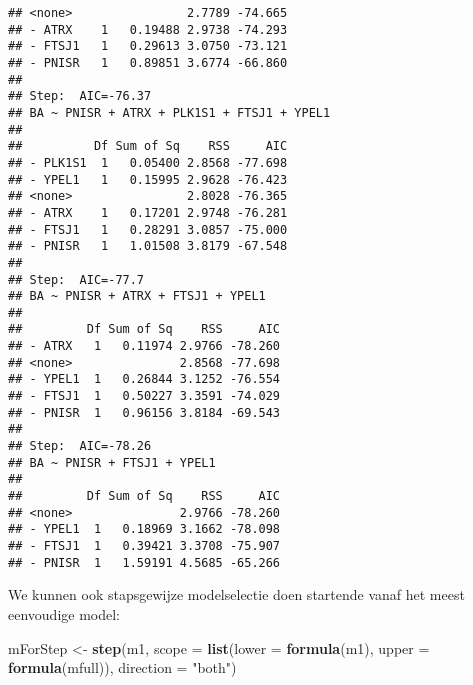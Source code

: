 \documentclass[12pt,dutch,coursenotes]{book}
\newenvironment{Shaded}{\begin{snugshade}}{\end{snugshade}}
\newcommand{\KeywordTok}[1]{\textcolor[rgb]{0.13,0.29,0.53}{\textbf{#1}}}
\newcommand{\DataTypeTok}[1]{\textcolor[rgb]{0.13,0.29,0.53}{#1}}
\newcommand{\StringTok}[1]{\textcolor[rgb]{0.31,0.60,0.02}{#1}}
\newcommand{\NormalTok}[1]{#1}
\theoremstyle{definition}
\theoremstyle{definition}
\theoremstyle{definition}
\theoremstyle{remark}
\begin{document}
\begin{verbatim}
## <none>                2.7789 -74.665
## - ATRX    1   0.19488 2.9738 -74.293
## - FTSJ1   1   0.29613 3.0750 -73.121
## - PNISR   1   0.89851 3.6774 -66.860
## 
## Step:  AIC=-76.37
## BA ~ PNISR + ATRX + PLK1S1 + FTSJ1 + YPEL1
## 
##          Df Sum of Sq    RSS     AIC
## - PLK1S1  1   0.05400 2.8568 -77.698
## - YPEL1   1   0.15995 2.9628 -76.423
## <none>                2.8028 -76.365
## - ATRX    1   0.17201 2.9748 -76.281
## - FTSJ1   1   0.28291 3.0857 -75.000
## - PNISR   1   1.01508 3.8179 -67.548
## 
## Step:  AIC=-77.7
## BA ~ PNISR + ATRX + FTSJ1 + YPEL1
## 
##         Df Sum of Sq    RSS     AIC
## - ATRX   1   0.11974 2.9766 -78.260
## <none>               2.8568 -77.698
## - YPEL1  1   0.26844 3.1252 -76.554
## - FTSJ1  1   0.50227 3.3591 -74.029
## - PNISR  1   0.96156 3.8184 -69.543
## 
## Step:  AIC=-78.26
## BA ~ PNISR + FTSJ1 + YPEL1
## 
##         Df Sum of Sq    RSS     AIC
## <none>               2.9766 -78.260
## - YPEL1  1   0.18969 3.1662 -78.098
## - FTSJ1  1   0.39421 3.3708 -75.907
## - PNISR  1   1.59191 4.5685 -65.266
\end{verbatim}

We kunnen ook stapsgewijze modelselectie doen startende vanaf het meest
eenvoudige model:

\begin{Shaded}
\begin{Highlighting}[]
\NormalTok{mForStep <-}\StringTok{ }\KeywordTok{step}\NormalTok{(m1, }\DataTypeTok{scope =} \KeywordTok{list}\NormalTok{(}\DataTypeTok{lower =} \KeywordTok{formula}\NormalTok{(m1), }
    \DataTypeTok{upper =} \KeywordTok{formula}\NormalTok{(mfull)), }\DataTypeTok{direction =} \StringTok{"both"}\NormalTok{)}
\end{Highlighting}
\end{Shaded}
\end{document}
